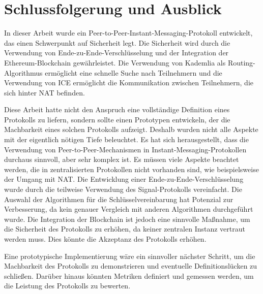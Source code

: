 \chapter{Schlussfolgerung und Ausblick}

In dieser Arbeit wurde ein Peer-to-Peer-Instant-Messaging-Protokoll entwickelt, das einen Schwerpunkt auf Sicherheit legt. Die Sicherheit wird durch die Verwendung von Ende-zu-Ende-Verschlüsselung und der Integration der Ethereum-Blockchain gewährleistet. Die Verwendung von Kademlia als Routing-Algorithmus ermöglicht eine schnelle Suche nach Teilnehmern und die Verwendung von ICE ermöglicht die Kommunikation zwischen Teilnehmern, die sich hinter NAT befinden.

Diese Arbeit hatte nicht den Anspruch eine vollständige Definition eines Protokolls zu liefern, sondern sollte einen Prototypen entwickeln, der die Machbarkeit eines solchen Protokolls aufzeigt. Deshalb wurden nicht alle Aspekte mit der eigentlich nötigen Tiefe beleuchtet. Es hat sich herausgestellt, dass die Verwendung von Peer-to-Peer-Mechanismen in Instant-Messaging-Protokollen durchaus sinnvoll, aber sehr komplex ist. Es müssen viele Aspekte beachtet werden, die in zentralisierten Protokollen nicht vorhanden sind, wie beispielsweise der Umgang mit NAT. Die Entwicklung einer Ende-zu-Ende-Verschlüsselung wurde durch die teilweise Verwendung des Signal-Protokolls vereinfacht. Die Auswahl der Algorithmen für die Schlüsselvereinbarung hat Potenzial zur Verbesserung, da kein genauer Vergleich mit anderen Algorithmen durchgeführt wurde. Die Integration der Blockchain ist jedoch eine sinnvolle Maßnahme, um die Sicherheit des Protokolls zu erhöhen, da keiner zentralen Instanz vertraut werden muss. Dies könnte die Akzeptanz des Protokolls erhöhen.

Eine prototypische Implementierung wäre ein sinnvoller nächster Schritt, um die Machbarkeit des Protokolls zu demonstrieren und eventuelle Definitionslücken zu schließen. Darüber hinaus könnten Metriken definiert und gemessen werden, um die Leistung des Protokolls zu bewerten.